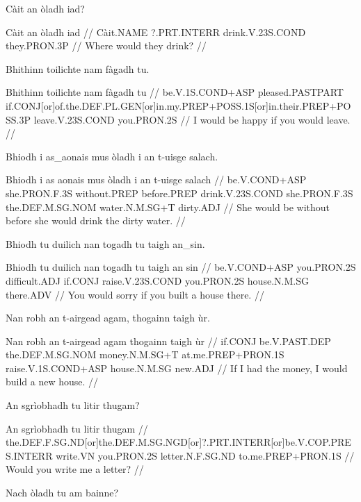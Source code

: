 \documentclass[a4paper,10pt]{article}
\begin{document}
\ex
\begingl
\glpre Càit an òladh iad? 

\vspace{4mm}
\gla Càit an òladh iad  //
\glb Càit.NAME ?.PRT.INTERR drink.V.23S.COND they.PRON.3P  //
\glft Where would they drink? //
\endgl
\xe

\ex
\begingl
\glpre Bhithinn toilichte nam fàgadh tu. 

\vspace{4mm}
\gla Bhithinn toilichte nam fàgadh tu  //
\glb be.V.1S.COND+ASP pleased.PASTPART if.CONJ[or]of.the.DEF.PL.GEN[or]in.my.PREP+POSS.1S[or]in.their.PREP+POSS.3P leave.V.23S.COND you.PRON.2S  //
\glft I would be happy if you would leave. //
\endgl
\xe

\ex
\begingl
\glpre Bhiodh i as\_aonais mus òladh i an t-uisge salach. 

\vspace{4mm}
\gla Bhiodh i {as aonais} mus òladh i an t-uisge salach  //
\glb be.V.COND+ASP she.PRON.F.3S without.PREP before.PREP drink.V.23S.COND she.PRON.F.3S the.DEF.M.SG.NOM water.N.M.SG+T dirty.ADJ  //
\glft She would be without before she would drink the dirty water. //
\endgl
\xe

\ex
\begingl
\glpre Bhiodh tu duilich nan togadh tu taigh an\_sin. 

\vspace{4mm}
\gla Bhiodh tu duilich nan togadh tu taigh {an sin}  //
\glb be.V.COND+ASP you.PRON.2S difficult.ADJ if.CONJ raise.V.23S.COND you.PRON.2S house.N.M.SG there.ADV  //
\glft You would sorry if you built a house there. //
\endgl
\xe

\ex
\begingl
\glpre Nan robh an t-airgead agam, thogainn taigh ùr. 

\vspace{4mm}
\gla Nan robh an t-airgead agam thogainn taigh ùr  //
\glb if.CONJ be.V.PAST.DEP the.DEF.M.SG.NOM money.N.M.SG+T at.me.PREP+PRON.1S raise.V.1S.COND+ASP house.N.M.SG new.ADJ  //
\glft If I had the money, I would build a new house. //
\endgl
\xe

\ex
\begingl
\glpre An sgrìobhadh tu litir thugam? 

\vspace{4mm}
\gla An sgrìobhadh tu litir thugam  //
\glb the.DEF.F.SG.ND[or]the.DEF.M.SG.NGD[or]?.PRT.INTERR[or]be.V.COP.PRES.INTERR write.VN you.PRON.2S letter.N.F.SG.ND to.me.PREP+PRON.1S  //
\glft Would you write me a letter? //
\endgl
\xe

\ex
\begingl
\glpre Nach òladh tu am bainne? 
\end{document}
